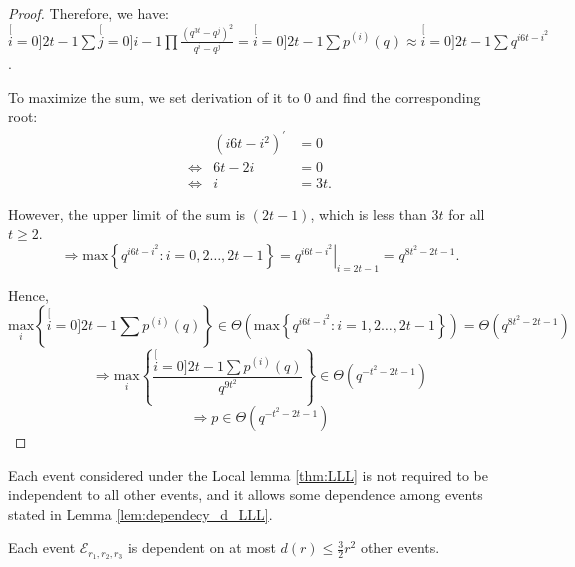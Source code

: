 \begin{proof}
Therefore, we have: $\stackrel[i=0]{2t-1}{\mathop{\sum}}\stackrel[j=0]{i-1}{\mathop{\prod}}\frac{\left(q^{3t}-q^{j}\right)^{2}}{q^{i}-q^{j}}=\stackrel[i=0]{2t-1}{\mathop{\sum}}p^{(i)}(q)\approx\stackrel[i=0]{2t-1}{\mathop{\sum}}q^{i6t-i^{2}}$.

To maximize the sum, we set derivation of it to 0 and find the corresponding
root: 
\begin{eqnarray*}
 & \left(i6t-i^{2}\right)^{'} & =0\\
\Leftrightarrow & 6t-2i & =0\\
\Leftrightarrow & i & =3t.
\end{eqnarray*}

However, the upper limit of the sum is $\left(2t-1\right)$, which
is less than $3t$ for all $t\geq2$.
\[
\Rightarrow\mathrm{max}\left\{ q^{i6t-i^{2}}:i=0,2\ldots,2t-1\right\} =\left.q^{i6t-i^{2}}\right|_{i=2t-1}=q^{8t^{2}-2t-1}.
\]

Hence,
\[
\underset{i}{\mathrm{max}}\left\{ \stackrel[i=0]{2t-1}{\mathop{\sum}}p^{(i)}(q)\right\} \in\Theta\left(\mathrm{max}\left\{ q^{i6t-i^{2}}:i=1,2\ldots,2t-1\right\} \right)=\Theta\left(q^{8t^{2}-2t-1}\right)
\]
\[
\Rightarrow\underset{i}{\mathrm{max}}\left\{ \frac{\stackrel[i=0]{2t-1}{\mathop{\sum}}p^{(i)}(q)}{q^{9t^{2}}}\right\} \in\Theta\left(q^{-t^{2}-2t-1}\right)
\]
\[
\Rightarrow p\in\Theta\left(q^{-t^{2}-2t-1}\right)
\]
\end{proof}
Each event considered under the Local lemma \ref{thm:LLL} is not
required to be independent to all other events, and it allows some
dependence among events stated in Lemma \ref{lem:dependecy_d_LLL}.
\begin{lem}
Each event $\mathcal{E}_{r_{1},r_{2},r_{3}}$ is dependent on at most
$d\left(r\right)\leq\frac{3}{2}r^{2}$ other events. \label{lem:dependecy_d_LLL}
\end{lem}
